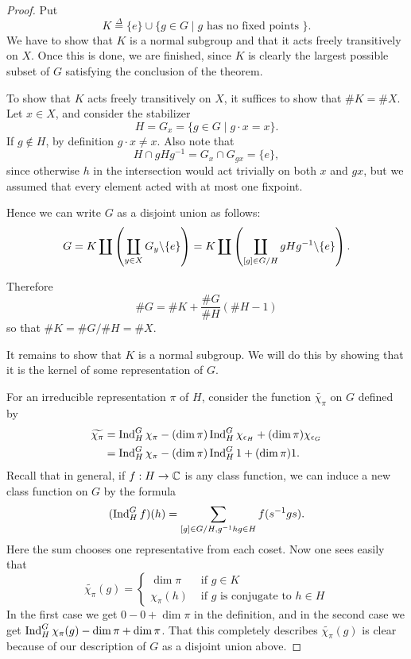 \documentclass[11pt, english]{article}
\begin{document}
\begin{proof}

Put
$$
K \stackrel{\Delta}{=} \{ e \} \cup \{ g\in G \mid g  \text{ has no fixed points } \}.
$$
We have to show that $K$ is a normal subgroup and that it acts freely transitively on $X$. Once this is done, we are finished, since $K$ is clearly the largest possible subset of $G$ satisfying the conclusion of the theorem.

To show that $K$ acts freely transitively on $X$, it suffices to show that $\# K=\#X$. Let $x \in X$, and consider the stabilizer
$$
H = G_x = \{ g \in G \mid g \cdot x = x \}.
$$
If $g \not \in H$, by definition $g \cdot x \neq x$. Also note that
$$
H \cap g H g^{-1} = G_x \cap G_{gx} = \{ e \},
$$
since otherwise $h$ in the intersection would act trivially on both $x$ and $gx$, but we assumed that every element acted with at most one fixpoint.

Hence we can write $G$ as a disjoint union as follows:
$$
G = K \coprod \left( \coprod_{y \in X} G_y \backslash \{ e\} \right) = K \coprod \left( \coprod_{[g] \in G/H} gHg^{-1} \backslash \{e \} \right).
$$

Therefore
$$
\# G = \#K  + \frac{ \# G}{\# H}( \# H  -1 )
$$
so that $\# K = \# G / \# H = \# X$.

It remains to show that $K$ is a normal subgroup. We will do this by showing that it is the kernel of some representation of $G$.

For an irreducible representation $\pi$ of $H$, consider the function $\widetilde{\chi_\pi}$ on $G$ defined by
\begin{align*}
\widetilde{\chi_\pi} &= \operatorname{Ind}_H^G \chi_\pi - (\dim \pi) \operatorname{Ind}_H^G \chi_{\epsilon_H} + (\dim \pi) \chi_{\epsilon_G} \\
&= \operatorname{Ind}_H^G \chi_\pi - (\dim \pi) \operatorname{Ind}_H^G 1 + (\dim \pi) 1.
\end{align*}
Recall that in general, if $f:H \to \mathbb{C}$ is any class function, we can induce a new class function on $G$ by the formula
$$
(\operatorname{Ind}_H ^G f)(h) = \sum_{[g] \in G/H, g^{-1}hg \in H} f(s^{-1} g s).
$$
Here the sum chooses one representative from each coset. Now one sees easily that
$$
\widetilde{\chi_\pi}(g) = \begin{cases} \dim \pi & \text{ if } g \in K \\
\chi_\pi(h) & \text{ if $g$ is conjugate to $h \in H$}
\end{cases}
$$
In the first case we get $0-0+\dim \pi$ in the definition, and in the second case we get $\operatorname{Ind}_H^G \chi_\pi(g)-\dim \pi + \dim \pi$. That this completely describes $\widetilde{\chi_\pi}(g)$ is clear because of our description of $G$ as a disjoint union above.


\end{proof}
\end{document}
